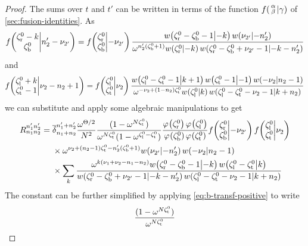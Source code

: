 \documentclass{sl2ams}
\numberwithin{equation}{section}
\begin{document}
\begin{proof}
The sums over \(t\) and \(t'\) can be written in terms of the function \(f\mathopen{}\left( \begin{smallmatrix} \alpha \\ \beta \end{smallmatrix}\middle| \gamma \right)\) of \cref{sec:fusion-identities}.
As
\[
  f\mathopen{}\left( \begin{matrix} \zeta_{\mathrm{r}}^0 - k \\ \zeta_{\mathrm{b}}^0 \end{matrix}\middle| n_2' - \nu_{2'} \right)
  =
  f\mathopen{}\left( \begin{matrix} \zeta_{\mathrm{r}}^0  \\ \zeta_{\mathrm{b}}^0 \end{matrix}\middle| - \nu_{2'} \right)
  \frac{
    w\mathopen{}\left(\zeta_{\mathrm{r}}^0 - \zeta_{\mathrm{b}}^0 - 1 \middle | -k \right)
    w\mathopen{}\left(\nu_{2'} \middle | -n_2' \right)
  }{
    \omega^{n_2'(\zeta_{\mathrm{b}}^0 + 1)}
    w\mathopen{}\left(\zeta_{\mathrm{r}}^0 \middle | -k \right)
    w\mathopen{}\left(\zeta_{\mathrm{r}}^0 - \zeta_{\mathrm{b}}^0 + \nu_{2'} - 1 \middle | -k - n_2' \right)
  }
\]
and
\[
  f\mathopen{}\left( \begin{matrix} \zeta_{\mathrm{l}}^0 + k \\ \zeta_{\mathrm{t}}^0 - 1 \end{matrix}\middle| \nu_2 - n_2 + 1 \right)
  =
  f\mathopen{}\left( \begin{matrix} \zeta_{\mathrm{l}}^0  \\ \zeta_{\mathrm{t}}^0 \end{matrix}\middle| \nu_{2} \right)
  \frac{
    w\mathopen{}\left(\zeta_{\mathrm{l}}^0 - \zeta_{\mathrm{t}}^0 - 1 \middle | k + 1 \right)
    w\mathopen{}\left(\zeta_{\mathrm{t}}^{0} - 1 \middle | -1 \right)
    w\mathopen{}\left(-\nu_{2} \middle | n_2 - 1 \right)
  }{
    \omega^{- \nu_{2} + (1 - n_2)\zeta_{\mathrm{t}}^0}
    w\mathopen{}\left(\zeta_{\mathrm{l}}^0 \middle | k \right)
    w\mathopen{}\left(\zeta_{\mathrm{l}}^0 - \zeta_{\mathrm{t}}^0 - \nu_{2} - 1 \middle | k + n_2 \right)
  }
\]
we can substitute and apply some algebraic manipulations to get
  \begin{equation}
    \begin{aligned}
      R_{n_1 n_2}^{n_1' n_2'}
      =
      {}
      &
      \nrdel{n_1 + n_2}{n_1' +  n_2'}
      \frac{
        \omega^{\Theta/2}
      }{
        \nr^{2}
      }
      \frac{
        (1 - \omega^{\nr\zeta_{\lW}^0})
      }{
        \omega^{\nr \zeta_{\lW}^0}
        (1 - \omega^{\zeta_{\lS}^{0} - \zeta_{\lW}^0})
      }
      \frac{
        \pf{\zeta_{\lN}^0}
        \pf{\zeta_{\lS}^0}
      }{
        \pf{\zeta_{\lE}^0}
        \pf{\zeta_{\lW}^0}
      }
      \fstack{\zeta_{\lN}^0 }{\zeta_{\lE}^0}{- \nu_{2'}}
      \fstack{\zeta_{\lS}^0 }{\zeta_{\lW}^0}{\nu_{2}}
      \\
      &\times
      \omega^{\nu_{2} + (n_{2} - 1) \zeta_{\lW}^{0} - n_{2}' (\zeta_{\lE}^{0} + 1) }
      \qlog{\nu_{2'}}{-n_2'}
      \qlog{-\nu_{2}}{n_2 - 1}
      \\
      &\times
      \sum_{k}
      \frac{
        \omega^{k(\nu_{1} + \nu_{2} - n_1 - n_2)}
        \qlog{\zeta_{\lN}^0 - \zeta_{\lE}^0- 1}{-k}
        \qlog{\zeta_{\lS}^0 - \zeta_{\lW}^0}{k}
      }{
        \qlog{\zeta_{\lN}^0 - \zeta_{\lE}^0 + \nu_{2'} - 1}{-k - n_2'}
        \qlog{\zeta_{\lS}^0 - \zeta_{\lW}^0 - \nu_{2} - 1}{k + n_2 }
      }
    \end{aligned}
  \end{equation}
  The constant can be further simplified by applying \cref{eq:b-transf-positive} to write
  \begin{align*}
    \frac{
      (1 - \omega^{N\zeta_{\mathrm{t}}^0})
    }{
      \omega^{N \zeta_{\mathrm{t}}^0}
}
\end{align*}
\end{proof}
\end{document}
